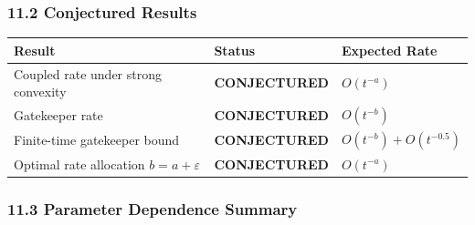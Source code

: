 \documentclass[
  12pt,
]{ctexart}
\begin{document}
\subsubsection{11.2 Conjectured Results}\label{conjectured-results}

\begin{longtable}[]{@{}
  >{\raggedright\arraybackslash}p{}
  >{\raggedright\arraybackslash}p{}
  >{\raggedright\arraybackslash}p{}@{}}
\toprule\noalign{}
\begin{minipage}[b]{\linewidth}\raggedright
Result
\end{minipage} & \begin{minipage}[b]{\linewidth}\raggedright
Status
\end{minipage} & \begin{minipage}[b]{\linewidth}\raggedright
Expected Rate
\end{minipage} \\
\midrule\noalign{}
\endhead
\bottomrule\noalign{}
\endlastfoot
Coupled rate under strong convexity & \textbf{CONJECTURED} &
\(O(t^{-a})\) \\
Gatekeeper rate & \textbf{CONJECTURED} & \(O(t^{-b})\) \\
Finite-time gatekeeper bound & \textbf{CONJECTURED} &
\(O(t^{-b}) + O(t^{-0.5})\) \\
Optimal rate allocation \(b = a + \varepsilon\) & \textbf{CONJECTURED} &
\(O(t^{-a})\) \\
\end{longtable}

\subsubsection{11.3 Parameter Dependence
Summary}\label{parameter-dependence-summary}
\end{document}
